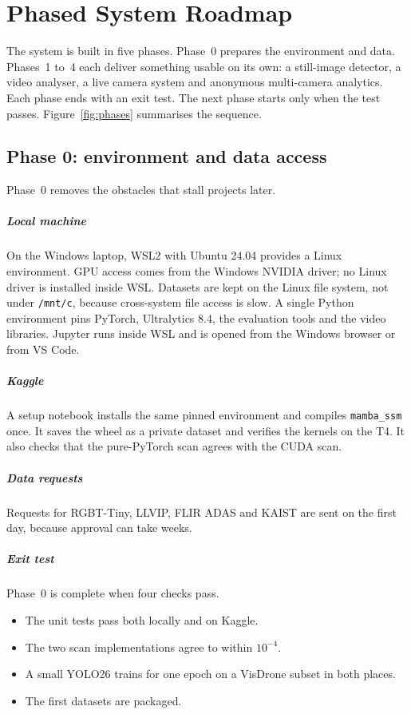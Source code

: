 \chapter{Phased System Roadmap}
\label{ch:roadmap}

The system is built in five phases. Phase~0 prepares the environment and
data. Phases~1 to~4 each deliver something usable on its own: a still-image
detector, a video analyser, a live camera system and anonymous multi-camera
analytics. Each phase ends with an exit test. The next phase starts only when
the test passes. Figure~\ref{fig:phases} summarises the sequence.



\section{Phase 0: environment and data access}
\label{sec:phase0}

Phase~0 removes the obstacles that stall projects later.

\paragraph{Local machine}
On the Windows laptop, WSL2 with Ubuntu 24.04 provides a Linux environment.
GPU access comes from the Windows NVIDIA driver; no Linux driver is
installed inside WSL. Datasets are kept on the Linux file system, not under
\texttt{/mnt/c}, because cross-system file access is slow. A single Python
environment pins PyTorch, Ultralytics 8.4, the evaluation tools and the
video libraries. Jupyter runs inside WSL and is opened from the Windows
browser or from VS Code.

\paragraph{Kaggle}
A setup notebook installs the same pinned environment and compiles
\texttt{mamba\_ssm} once. It saves the wheel as a private dataset and
verifies the kernels on the T4. It also checks that the pure-PyTorch scan
agrees with the CUDA scan.

\paragraph{Data requests}
Requests for RGBT-Tiny, LLVIP, FLIR ADAS and KAIST are sent on the first
day, because approval can take weeks.

\paragraph{Exit test}
Phase~0 is complete when four checks pass.
\begin{itemize}
  \item The unit tests pass both locally and on Kaggle.
  \item The two scan implementations agree to within $10^{-4}$.
  \item A small YOLO26 trains for one epoch on a VisDrone subset in both
        places.
  \item The first datasets are packaged.
\end{itemize}

